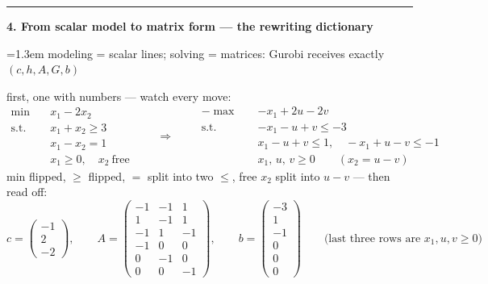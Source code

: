 \documentclass[10pt]{article}
\newcommand{\beat}[2]{%
  \par\medskip
  {\color{ruleink}\rule{\textwidth}{1pt}}\par\nobreak\vspace{2pt}
  {\large\bfseries #1.\; #2}\par\nobreak\vspace{3pt}}
\newenvironment{board}{%
  \par\vspace{2pt}
  \begingroup\leftskip=1.3em\relax}{%
  \par\endgroup\vspace{2pt}}
\begin{document}
\beat{4}{From scalar model to matrix form --- the rewriting dictionary}
\begin{board}
modeling = scalar lines; solving = matrices: Gurobi receives exactly $(c, h, A, G, b)$
\vspace{3pt}

first, one with numbers --- watch every move:
\[
\begin{aligned}
  \min\quad & x_1 - 2x_2 \\
  \text{s.t.}\quad & x_1 + x_2 \ge 3 \\
                   & x_1 - x_2 = 1 \\
                   & x_1 \ge 0, \quad x_2 \ \text{free}
\end{aligned}
\qquad\Longrightarrow\qquad
\begin{aligned}
  -\max\quad & -x_1 + 2u - 2v \\
  \text{s.t.}\quad & -x_1 - u + v \le -3 \\
                   & x_1 - u + v \le 1, \quad -x_1 + u - v \le -1 \\
                   & x_1,\, u,\, v \ge 0 \qquad (x_2 = u - v)
\end{aligned}
\]
\quad min flipped, $\ge$ flipped, $=$ split into two $\le$, free $x_2$ split into $u - v$ --- then read off:
\[
  c = \begin{pmatrix} -1 \\ 2 \\ -2 \end{pmatrix}, \qquad
  A = \begin{pmatrix} -1 & -1 & 1 \\ 1 & -1 & 1 \\ -1 & 1 & -1 \\ -1 & 0 & 0 \\ 0 & -1 & 0 \\ 0 & 0 & -1 \end{pmatrix}, \qquad
  b = \begin{pmatrix} -3 \\ 1 \\ -1 \\ 0 \\ 0 \\ 0 \end{pmatrix}
  \qquad \text{(last three rows are $x_1, u, v \ge 0$)}
\]
\vspace{3pt}


\end{board}
\end{document}

